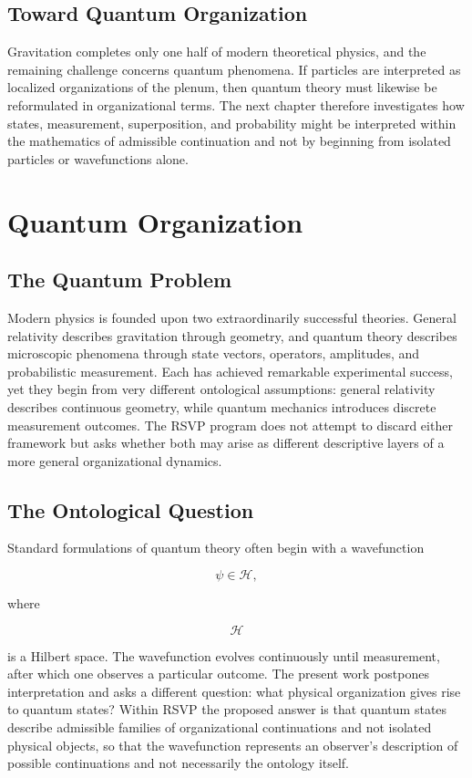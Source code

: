 \documentclass[11pt,oneside]{book}
\numberwithin{equation}{chapter}
\theoremstyle{definition}
\theoremstyle{plain}
\begin{document}
\section{Toward Quantum Organization}

Gravitation completes only one half of modern theoretical physics, and the remaining challenge concerns quantum phenomena. If particles are interpreted as localized organizations of the plenum, then quantum theory must likewise be reformulated in organizational terms. The next chapter therefore investigates how states, measurement, superposition, and probability might be interpreted within the mathematics of admissible continuation and not by beginning from isolated particles or wavefunctions alone.

\chapter{Quantum Organization}

\section{The Quantum Problem}

Modern physics is founded upon two extraordinarily successful theories. General relativity describes gravitation through geometry, and quantum theory describes microscopic phenomena through state vectors, operators, amplitudes, and probabilistic measurement. Each has achieved remarkable experimental success, yet they begin from very different ontological assumptions: general relativity describes continuous geometry, while quantum mechanics introduces discrete measurement outcomes. The RSVP program does not attempt to discard either framework but asks whether both may arise as different descriptive layers of a more general organizational dynamics.

\section{The Ontological Question}

Standard formulations of quantum theory often begin with a wavefunction

\[
\psi \in \mathcal H,
\]

where

\[
\mathcal H
\]

is a Hilbert space. The wavefunction evolves continuously until measurement, after which one observes a particular outcome. The present work postpones interpretation and asks a different question: what physical organization gives rise to quantum states? Within RSVP the proposed answer is that quantum states describe admissible families of organizational continuations and not isolated physical objects, so that the wavefunction represents an observer's description of possible continuations and not necessarily the ontology itself.
\end{document}
